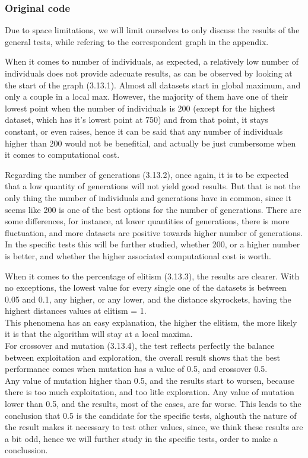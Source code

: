 \subsubsection{Original code}

Due to space limitations, we will limit ourselves to only discuss the results
of the general tests, while refering to the correspondent graph in the
appendix. 

When it comes to number of individuals, as expected, a relatively low number
of individuals does not provide adecuate results, as can be observed by looking
at the start of the graph (3.13.1). Almost all datasets start in global maximum, and only
a couple in a local max. However, the majority of them have one of their
lowest point when the number of individuals is 200 (except for the highest
dataset, which has it's lowest point at 750) and from that point, it stays
constant, or even raises, hence it can be said that any number of individuals higher than 200
would not be benefitial, and actually be just cumbersome when it comes to
computational cost.

Regarding the number of generations (3.13.2), once again, it is to be expected that a
low quantity of generations will not yield good results. But that is not the
only thing the number of individuals and generations have in common, since it
seems like 200 is one of the best options for the number of generations.
There are some differences, for instance, at lower quantities of
generations, there is more fluctuation, and more datasets are positive
towards higher number of generations. In the specific tests this will be
further studied, whether 200, or a higher number is better, and whether the
higher associated computational cost is worth.

When it comes to the percentage of elitism (3.13.3), the results are clearer.
With no exceptions, the lowest value for every single one of the datasets
is between 0.05 and 0.1, any higher, or any lower, and the distance
skyrockets, having the highest distances values at elitism = 1. \\
This phenomena has an easy explanation, the higher the elitism, the more likely it is that the
algorithm will stay at a local maxima. \\

For crossover and mutation (3.13.4), the test reflects perfectly the balance between exploitation and
exploration, the overall result shows that the best performance comes when
mutation has a value of 0.5, and crossover 0.5.\\
Any value of mutation higher than 0.5, and the results start to worsen, because
there is too much exploitation, and too litle exploration. Any value of mutation
lower than 0.5, and the results, most of the cases, are far worse. This leads to
the conclusion that 0.5 is the candidate for the specific tests, alghouth
the nature of the result makes it necessary to test other values, since,
we think these results are a bit odd, hence we will further
study in the specific tests, order to make a conclussion.

